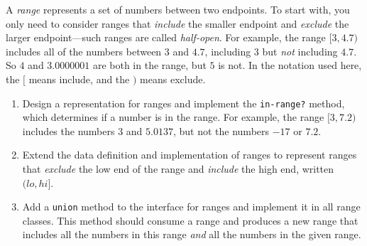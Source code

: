 \documentclass[12pt]{article}                   %
\def\pts#1{\marginpar{\footnotesize \raggedright  \fbox{#1 {\sc Points}}}}
\begin{document}
\vfill\thispagestyle{empty}
\newpage

\fi






\begin{problem}\pts{16}

A \emph{range} represents a set of numbers between two endpoints.  To
start with, you only need to consider ranges that \emph{include} the
smaller endpoint and \emph{exclude} the larger endpoint---such ranges
are called \emph{half-open}.  For example, the range $[3,4.7)$
includes all of the numbers between $3$ and $4.7$, including $3$ but
\emph{not} including $4.7$. So $4$ and $3.0000001$ are both in the
range, but $5$ is not.  In the notation used here, the $[$ means
include, and the $)$ means exclude.





\smallskip

\noindent
\begin{enumerate}
\item Design a representation for ranges and implement the
  \texttt{in-range?} method, which determines if a number is in the
  range.  For example, the range $[3,7.2)$ includes the numbers $3$
  and $5.0137$, but not the numbers $-17$ or $7.2$.

\item Extend the data definition and implementation of ranges to
  represent ranges that \emph{exclude} the low end of the range and
  \emph{include} the high end, written $(lo,hi]$.  

\item Add a \texttt{union} method to the interface for ranges and
  implement it in all range classes.  This method should consume a
  range and produces a new range that includes all the numbers in this
  range \emph{and} all the numbers in the given range.


\end{enumerate}
\end{problem}
\end{document}
